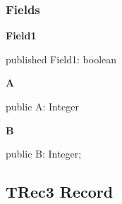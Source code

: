 \documentclass{report}
\newif\ifpdf
\begin{document}
\subsubsection*{\large{\textbf{Fields}}\normalsize\hspace{1ex}\hfill}
\begin{list}{}{
\setlength{\itemindent}{0cm}
\setlength{\listparindent}{0cm}
\setlength{\leftmargin}{\evensidemargin}
\addtolength{\leftmargin}{\tmplength}
\settowidth{\labelsep}{X}
\addtolength{\leftmargin}{\labelsep}
\setlength{\labelwidth}{\tmplength}
}
\label{ok_record_case_parsing.TRec2-Field1}
\item[\textbf{Field1}\hfill]
\ifpdf
\begin{flushleft}
\fi
\begin{ttfamily}
published Field1: boolean\end{ttfamily}

\ifpdf
\end{flushleft}
\fi


\par  \label{ok_record_case_parsing.TRec2-A}
\item[\textbf{A}\hfill]
\ifpdf
\begin{flushleft}
\fi
\begin{ttfamily}
public A: Integer\end{ttfamily}

\ifpdf
\end{flushleft}
\fi


\par  \label{ok_record_case_parsing.TRec2-B}
\item[\textbf{B}\hfill]
\ifpdf
\begin{flushleft}
\fi
\begin{ttfamily}
public B: Integer;\end{ttfamily}

\ifpdf
\end{flushleft}
\fi


\par  \end{list}
\ifpdf
\subsection*{\large{\textbf{TRec3 Record}}\normalsize\hspace{1ex}\hrulefill}
\else
\subsection*{TRec3 Record}
\fi
\label{ok_record_case_parsing.TRec3}
\end{document}
